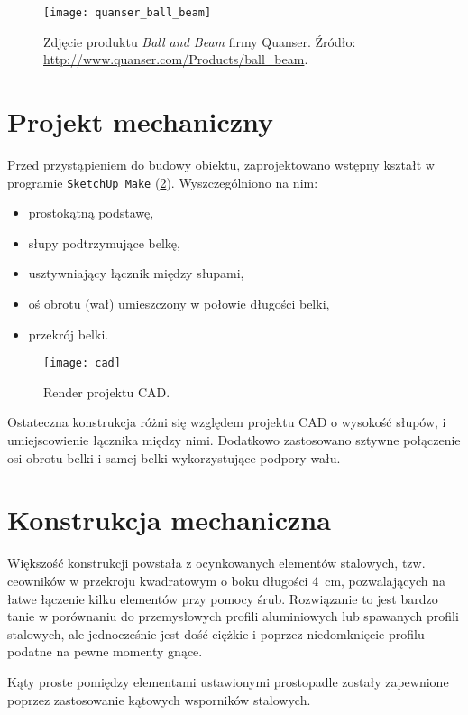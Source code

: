 \begin{figure}[H]
	\centering
	\texttt{[image: quanser\_ball\_beam]}
	\caption{Zdjęcie produktu \textit{Ball and Beam} firmy Quanser. Źródło: \url{http://www.quanser.com/Products/ball_beam}.}
	\label{fig:quanser_ball_beam}
\end{figure}

\section{Projekt mechaniczny}

Przed przystąpieniem do budowy obiektu, zaprojektowano wstępny kształt w programie  \texttt{SketchUp Make} (\cref{fig:cad_render_1}). Wyszczególniono na nim:

\begin{itemize}
	\item prostokątną podstawę,
	\item słupy podtrzymujące belkę,
	\item usztywniający łącznik między słupami,
	\item oś obrotu (wał) umieszczony w połowie długości belki,
	\item przekrój belki.
\end{itemize}

\begin{figure}[H]
	\centering
	\texttt{[image: cad]}
	\caption{Render projektu CAD.}
	\label{fig:cad_render_1}
\end{figure}

Ostateczna konstrukcja różni się względem projektu \textsc{CAD} o wysokość słupów, i umiejscowienie łącznika między nimi. Dodatkowo zastosowano sztywne połączenie osi obrotu belki i samej belki wykorzystujące podpory wału.

\section{Konstrukcja mechaniczna}

Większość konstrukcji powstała z ocynkowanych elementów stalowych, tzw. ceowników w przekroju kwadratowym o boku długości \SI{4}{cm}, pozwalających na łatwe łączenie kilku elementów przy pomocy śrub. Rozwiązanie to jest bardzo tanie w porównaniu do przemysłowych profili aluminiowych lub spawanych profili stalowych, ale jednocześnie jest dość ciężkie i poprzez niedomknięcie profilu podatne na pewne momenty gnące.

Kąty proste pomiędzy elementami ustawionymi prostopadle zostały zapewnione poprzez zastosowanie kątowych wsporników stalowych.

